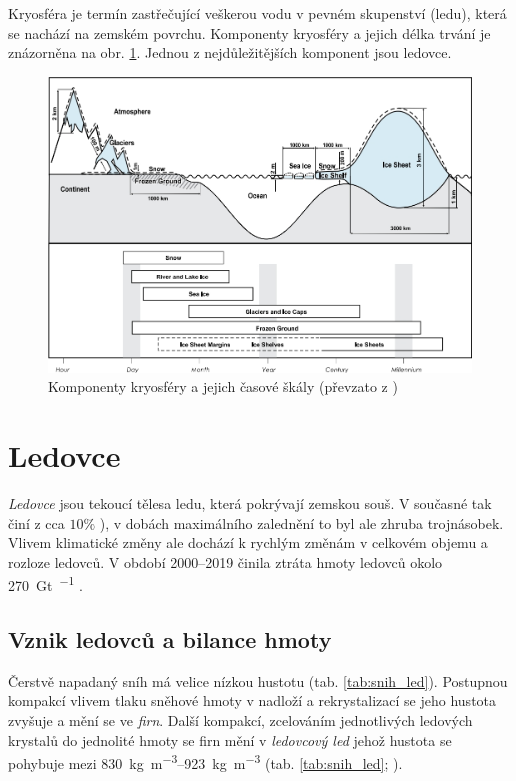 Kryosféra je termín zastřečující veškerou vodu v pevném skupenství (ledu), která se nachází na zemském povrchu. Komponenty kryosféry a jejich délka trvání je znázorněna na obr. \ref{fig:komponentykryosfery}. Jednou z nejdůležitějších komponent jsou ledovce. 
\begin{figure}
	\centering
	\includegraphics[width=1\linewidth]{obrazky/glac/komponenty_kryosfery}
	\caption{Komponenty kryosféry a jejich časové škály (převzato z \textcite{lemkeObservationsChangesSnow2007})}
	\label{fig:komponentykryosfery}
\end{figure}


\section{Ledovce}
\emph{Ledovce} jsou tekoucí tělesa ledu, která pokrývají zemskou souš. V současné tak činí z cca $10 \%$ \parencite{cuffeyPhysicsGlaciers2010}), v dobách maximálního zalednění to byl ale zhruba trojnásobek. Vlivem klimatické změny ale dochází k rychlým změnám v celkovém objemu a rozloze ledovců. V období 2000--2019 činila ztráta hmoty ledovců okolo \SI{270}{\giga\tonne\per\rok} \parencite{hugonnetAcceleratedGlobalGlacier2021}.

\subsection{Vznik ledovců a bilance hmoty}
Čerstvě napadaný sníh má velice nízkou hustotu (tab. \ref{tab:snih_led}). Postupnou kompakcí vlivem tlaku sněhové hmoty v nadloží a rekrystalizací se jeho hustota zvyšuje a mění se ve \emph{firn}. Další kompakcí, zcelováním jednotlivých ledových krystalů do jednolité hmoty se firn mění v \emph{ledovcový led} jehož hustota se pohybuje mezi \SIrange{830}{923}{\kilogram\per\cubic\metre} (tab. \ref{tab:snih_led}; \textcite{cuffeyPhysicsGlaciers2010}). 


